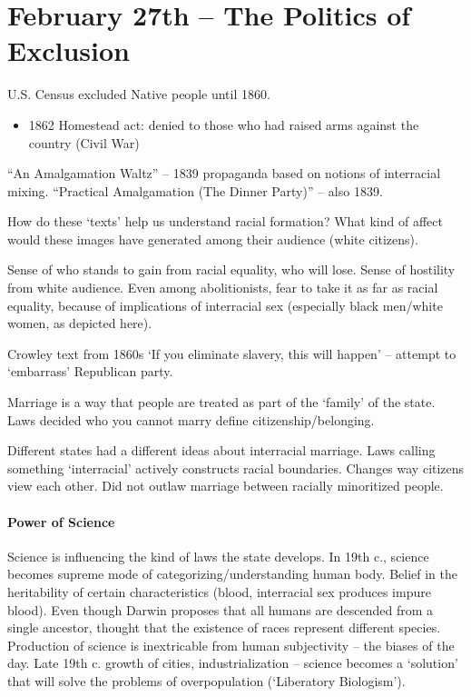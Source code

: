 \section{February 27th -- The Politics of Exclusion} 

U.S. Census excluded Native people until 1860.

\begin{itemize}
  \item 1862 Homestead act: denied to those who had raised arms against the country (Civil War)
\end{itemize}

``An Amalgamation Waltz'' -- 1839 propaganda based on notions of interracial mixing. ``Practical Amalgamation (The Dinner Party)'' -- also 1839. 

How do these `texts' help us understand racial formation? What kind of affect would these images have generated among their audience (white citizens).

Sense of who stands to gain from racial equality, who will lose. Sense of hostility from white audience. Even among abolitionists, fear to take it as far as racial equality, because of implications of interracial sex (especially black men/white women, as depicted here).

Crowley text from 1860s `If you eliminate slavery, this will happen' -- attempt to `embarrass' Republican party. 

Marriage is a way that people are treated as part of the `family' of the state. Laws decided who you cannot marry define citizenship/belonging.

Different states had a different ideas about interracial marriage. Laws calling something `interracial' actively constructs racial boundaries. Changes way citizens view each other. Did not outlaw marriage between racially minoritized people.

\paragraph{Power of Science} Science is influencing the kind of laws the state develops. In 19th c., science becomes supreme mode of categorizing/understanding human body. Belief in the heritability of certain characteristics (blood, interracial sex produces impure blood). Even though Darwin proposes that all humans are descended from a single ancestor, thought that the existence of races represent different species. Production of science is inextricable from human subjectivity -- the biases of the day. Late 19th c. growth of cities, industrialization -- science becomes a `solution' that will solve the problems of overpopulation (`Liberatory Biologism').

